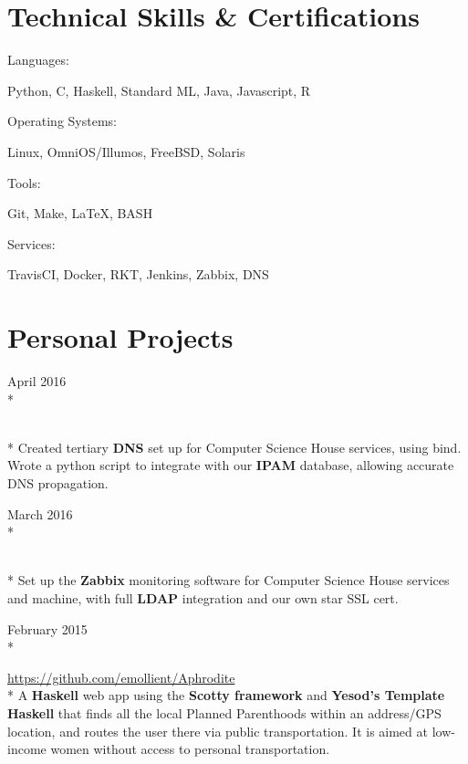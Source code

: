 \documentclass[a4paper,margin,line]{resume}
\newcommand{\rurl}[1]{\hfill {\footnotesize \url{#1}}}
\newcommand{\rdate}[1]{\hfill {\small #1}}
\newcommand{\rproject}[4]{\item[#1] \hfill \rdate{#2} \\* \hfill \rdate{#3} \strut\hfill \rurl{#4} \\*}
\begin{document}
\begin{resume}
\section{\mysidestyle Technical Skills \& Certifications}
	\begin{compactdesc}
		\item[Languages: ] \begin{asparablank} { \small
			\item Python, C, Haskell, Standard ML, Java, Javascript, R
		} \end{asparablank}
		\item[Operating Systems: ] \begin{asparablank} { \small
            \item Linux, OmniOS/Illumos, FreeBSD, Solaris
		} \end{asparablank}
		\item[Tools: ] \begin{asparablank} { \small
            \item Git, Make, \LaTeX, BASH
		} \end{asparablank}
		\item[Services: ] \begin{asparablank} { \small
            \item TravisCI, Docker, RKT, Jenkins, Zabbix, DNS
		} \end{asparablank}
	\end{compactdesc}

\section{\mysidestyle Personal Projects}
    \begin{asparadesc}
        \rproject{DNS for Computer Science House}{April 2016}{}{}
        \small
        Created tertiary {\bf DNS} set up for Computer Science House services, using bind. 
        Wrote a python script to integrate with our {\bf IPAM} database, allowing accurate 
        DNS propagation. 
        \normalsize
        \\
        \rproject{Zabbix for Computer Science House}{March 2016}{}{}
        \small
        Set up the {\bf Zabbix} monitoring software for Computer Science House services 
        and machine, with full {\bf LDAP} integration and our own star SSL cert.
        \normalsize
        \\
        \rproject{Aphrodite}{February 2015}{}{https://github.com/emollient/Aphrodite}
        \small
        A {\bf Haskell} web app using the {\bf Scotty framework} and {\bf Yesod's Template Haskell} 
        that finds all the local Planned Parenthoods within an address/GPS location, and routes the user
        there via public transportation. It is aimed at low-income women without access to personal
        transportation.
        \normalsize
    \end{asparadesc}


\end{resume}
\end{document}
